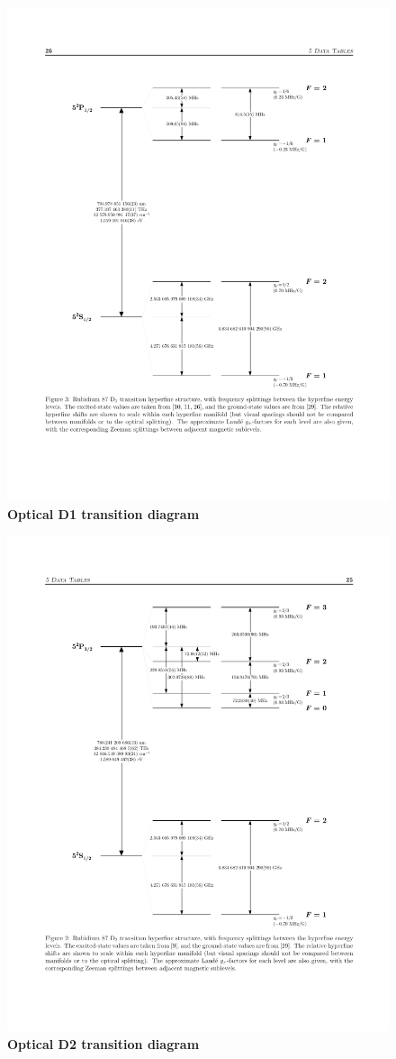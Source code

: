 \begin{figure}[ht!]
		\includegraphics[width=\columnwidth]{figures/ap1/SteckTableD1.pdf} 
		\caption{\textbf{Optical D1 transition diagram}  \cite{SteckRb} }
		\label{fig:SteckD1}	
\end{figure}

\begin{figure}[ht!]
		\includegraphics[width=\columnwidth]{figures/ap1/SteckTableD2.pdf} 
		\caption{\textbf{Optical D2 transition diagram}  \cite{SteckRb} }
		\label{fig:SteckD2}	
\end{figure}